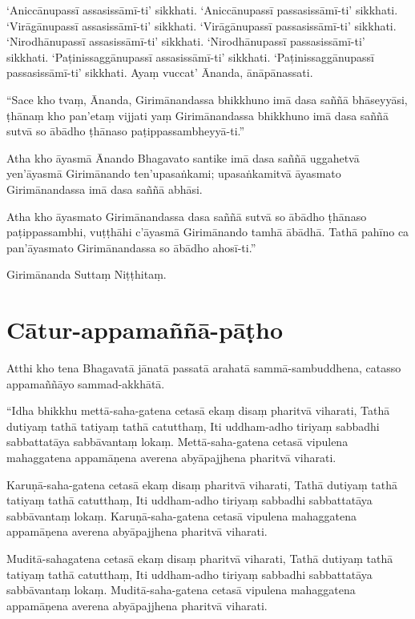 ‘Aniccānupassī assasissāmī-ti’ sikkhati. ‘Aniccānupassī passasissāmī-ti’
sikkhati. ‘Virāgānupassī assasissāmī-ti’ sikkhati. ‘Virāgānupassī
passasissāmī-ti’ sikkhati. ‘Nirodhānupassī assasissāmī-ti’ sikkhati.
‘Nirodhānupassī passasissāmī-ti’ sikkhati. ‘Paṭinissaggānupassī assasissāmī-ti’
sikkhati. ‘Paṭinissaggānupassī passasissāmī-ti’ sikkhati. Ayaṃ vuccat’ Ānanda,
ānāpānassati.

“Sace kho tvaṃ, Ānanda, Girimānandassa bhikkhuno imā dasa saññā bhāseyyāsi,
ṭhānaṃ kho pan’etaṃ vijjati yaṃ Girimānandassa bhikkhuno imā dasa saññā sutvā so
ābādho ṭhānaso paṭippassambheyyā-ti.”

Atha kho āyasmā Ānando Bhagavato santike imā dasa saññā uggahetvā yen’āyasmā
Girimānando ten’upasaṅkami; upasaṅkamitvā āyasmato Girimānandassa imā dasa saññā
abhāsi.

Atha kho āyasmato Girimānandassa dasa saññā sutvā so ābādho ṭhānaso
paṭippassambhi, vuṭṭhāhi c’āyasmā Girimānando tamhā ābādhā. Tathā pahīno ca
pan’āyasmato Girimānandassa so ābādho ahosī-ti.”

Girimānanda Suttaṃ Niṭṭhitaṃ.


\section{Cātur-appamaññā-pāṭho}



Atthi kho tena Bhagavatā jānatā passatā arahatā sammā-sambuddhena, catasso
appamaññāyo sammad-akkhātā.

“Idha bhikkhu mettā-saha-gatena cetasā ekaṃ disaṃ pharitvā viharati, Tathā
dutiyaṃ tathā tatiyaṃ tathā catutthaṃ, Iti uddham-adho tiriyaṃ sabbadhi
sabbattatāya sabbāvantaṃ lokaṃ. Mettā-saha-gatena cetasā vipulena mahaggatena
appamāṇena averena abyāpajjhena pharitvā viharati.

Karuṇā-saha-gatena cetasā ekaṃ disaṃ pharitvā viharati, Tathā dutiyaṃ tathā
tatiyaṃ tathā catutthaṃ, Iti uddham-adho tiriyaṃ sabbadhi sabbattatāya
sabbāvantaṃ lokaṃ. Karuṇā-saha-gatena cetasā vipulena mahaggatena appamāṇena
averena abyāpajjhena pharitvā viharati.

Muditā-sahagatena cetasā ekaṃ disaṃ pharitvā viharati, Tathā dutiyaṃ tathā
tatiyaṃ tathā catutthaṃ, Iti uddham-adho tiriyaṃ sabbadhi sabbattatāya
sabbāvantaṃ lokaṃ. Muditā-saha-gatena cetasā vipulena mahaggatena appamāṇena
averena abyāpajjhena pharitvā viharati.

